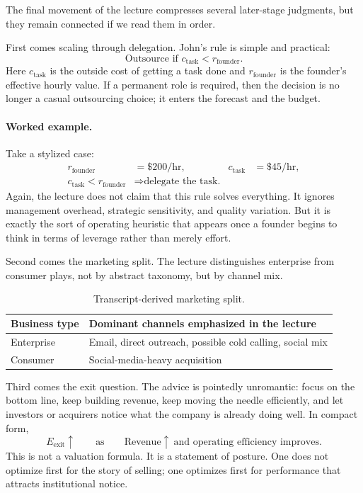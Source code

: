 The final movement of the lecture compresses several later-stage judgments, but they remain connected if we read them in order.

First comes scaling through delegation. John's rule is simple and practical:
\begin{equation}
\text{Outsource if } c_{\mathrm{task}} < r_{\mathrm{founder}}.
\end{equation}
Here \(c_{\mathrm{task}}\) is the outside cost of getting a task done and \(r_{\mathrm{founder}}\) is the founder's effective hourly value. If a permanent role is required, then the decision is no longer a casual outsourcing choice; it enters the forecast and the budget.

\paragraph{Worked example.}
Take a stylized case:
\begin{align}
r_{\mathrm{founder}} &= \$200/\text{hr}, &
c_{\mathrm{task}} &= \$45/\text{hr}, \\
c_{\mathrm{task}} < r_{\mathrm{founder}}
&\Longrightarrow \text{delegate the task.}
\end{align}
Again, the lecture does not claim that this rule solves everything. It ignores management overhead, strategic sensitivity, and quality variation. But it is exactly the sort of operating heuristic that appears once a founder begins to think in terms of leverage rather than merely effort.

Second comes the marketing split. The lecture distinguishes enterprise from consumer plays, not by abstract taxonomy, but by channel mix.

\begin{table}[h]
\centering
\begin{tabular}{|l|l|}
\hline
Business type & Dominant channels emphasized in the lecture \\
\hline
Enterprise & Email, direct outreach, possible cold calling, social mix \\
Consumer & Social-media-heavy acquisition \\
\hline
\end{tabular}
\caption{Transcript-derived marketing split.}
\end{table}

Third comes the exit question. The advice is pointedly unromantic: focus on the bottom line, keep building revenue, keep moving the needle efficiently, and let investors or acquirers notice what the company is already doing well. In compact form,
\begin{equation}
E_{\mathrm{exit}} \uparrow
\qquad \text{as} \qquad
\mathrm{Revenue} \uparrow \ \text{and operating efficiency improves}.
\end{equation}
This is not a valuation formula. It is a statement of posture. One does not optimize first for the story of selling; one optimizes first for performance that attracts institutional notice.

